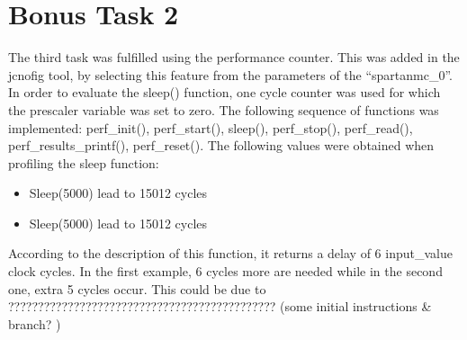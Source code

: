 
	\section{Bonus Task 2} %
	\label{sec:impl_bonus_task_2}
		The third task was fulfilled using the performance counter. This was added in the jcnofig tool, by selecting this feature from the parameters of the “spartanmc\_0”. In order to evaluate the sleep() function, one cycle counter was used for which the prescaler variable was set to zero. The following sequence of functions was implemented: perf\_init(\*), perf\_start(\*), sleep(\*), perf\_stop(\*), perf\_read(\*), perf\_results\_printf(\*), perf_reset(). The following values were obtained when profiling the sleep function:
		\begin{itemize}
			\item Sleep(5000)  lead to 15012 cycles
			\item Sleep(5000)  lead to 15012 cycles
		\end{itemize}
		According to the description of this function, it returns a delay of 6  \* input\_value clock cycles. In the first example, 6 cycles more are needed while in the second one, extra 5 cycles occur. This could be due to ????????????????????????????????????????????? (some initial instructions & branch? )
